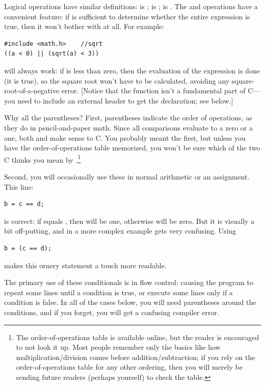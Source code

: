 \documentclass[12pt]{article}
\begin{document}
Logical operations have similar definitions: \cindex{\&\&}  
  
 is ;  is ;  is .
The \cinline{\&\&} and  operations have a convenient feature: if  is sufficient to determine whether
the entire expression is true, then it won't bother with  at all. For example:
\begin{lstlisting}
#include <math.h>    //sqrt
((a < 0) || (sqrt(a) < 3))
\end{lstlisting}
will always work: if  is less than zero, then the evaluation
of the expression is done (it is true), so the square root won't have
to be calculated, avoiding any square-root-of-a-negative error. [Notice
that the  function isn't a fundamental part of C---you
need to include an external header to get the declaration; see below.]

Why all the parentheses? First, parentheses indicate the order of
operations, as they do in pencil-and-paper math. Since all comparisons
evaluate to a zero or a one, both 
and  make sense to C. You probably meant
the first, but unless you have the order-of-operations table memorized,
you won't be sure which of the two C thinks you mean by .\footnote{The order-of-operations table is available
online, but the reader is encouraged to not look it up. Most
people remember only the basics like how multiplication/division comes before
addition/subtraction; if you rely on the order-of-operations table
for any other ordering, then you will merely be sending future readers
(perhaps yourself) to check the table.}

Second, you will occasionally use these in normal arithmetic or an assignment. This line:
\begin{lstlisting}
b = c == d;
\end{lstlisting}
is correct: if  equals , then  will be one, otherwise  will be zero. But
it is visually a bit off-putting, and in a more complex example gets very confusing. Using
\begin{lstlisting}
b = (c == d);
\end{lstlisting}
makes this ornery statement a touch more readable.

The primary use of these conditionals is in flow control: causing
the program to repeat some lines until a condition is true, or execute some lines only if a condition is
false.  In all of the cases below, you will need parentheses around the conditions, and if you forget,
you will get a confusing compiler error.
\end{document}
